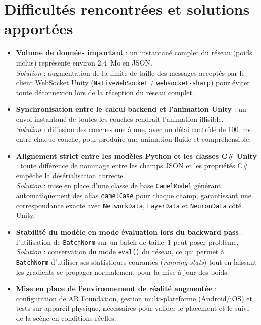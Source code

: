 \documentclass[12pt,a4paper]{report}
\begin{document}
\chapter{Difficult\'es rencontr\'ees et solutions apport\'ees}
\label{chap:difficultes}

\begin{itemize}
    \item \textbf{Volume de donn\'ees important} : un instantan\'e complet du
    r\'eseau (poids inclus) repr\'esente environ 2,4~Mo en JSON.\\
    \textit{Solution} : augmentation de la limite de taille des messages
    accept\'es par le client WebSocket Unity (\texttt{NativeWebSocket} /
    \texttt{websocket-sharp}) pour \'eviter toute d\'econnexion lors de la
    r\'eception du r\'eseau complet.

    \item \textbf{Synchronisation entre le calcul backend et l'animation
    Unity} : un envoi instantan\'e de toutes les couches rendrait
    l'animation illisible.\\
    \textit{Solution} : diffusion des couches une \`a une, avec un d\'elai
    contr\^ol\'e de 100~ms entre chaque couche, pour produire une animation
    fluide et compr\'ehensible.

    \item \textbf{Alignement strict entre les mod\`eles Python et les classes
    C\# Unity} : toute diff\'erence de nommage entre les champs JSON et les
    propri\'et\'es C\# emp\^eche la d\'es\'erialisation correcte.\\
    \textit{Solution} : mise en place d'une classe de base
    \texttt{CamelModel} g\'en\'erant automatiquement des alias
    \texttt{camelCase} pour chaque champ, garantissant une correspondance
    exacte avec \texttt{NetworkData}, \texttt{LayerData} et
    \texttt{NeuronData} c\^ot\'e Unity.

    \item \textbf{Stabilit\'e du mod\`ele en mode \'evaluation lors du
    backward pass} : l'utilisation de \texttt{BatchNorm} sur un batch de
    taille~1 peut poser probl\`eme.\\
    \textit{Solution} : conservation du mode \texttt{eval()} du r\'eseau,
    ce qui permet \`a \texttt{BatchNorm} d'utiliser ses statistiques
    courantes (\textit{running stats}) tout en laissant les gradients se
    propager normalement pour la mise \`a jour des poids.

    \item \textbf{Mise en place de l'environnement de r\'ealit\'e
    augment\'ee} : configuration de AR Foundation, gestion multi-plateforme
    (Android/iOS) et tests sur appareil physique, n\'ecessaires pour valider
    le placement et le suivi de la sc\`ene en conditions r\'eelles.
\end{itemize}
\end{document}
